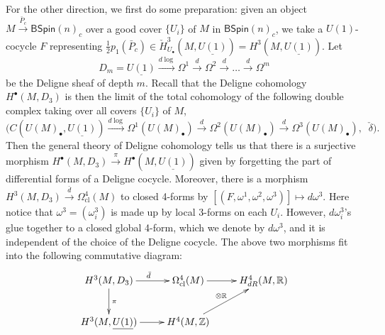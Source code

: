 \documentclass[letterpaper,10pt, oneside]{article} %
\newcommand {\emptycomment}[1]{}
\newcommand{\BSpin}{\mathsf{BSpin}}%
\newcommand{\cl}{\mathrm{cl}}
\newcommand{\R}{\mathbb R}\newcommand{\Z}{\mathbb Z}
\newcommand{\half}{\frac{1}{2}}
\newcommand{\bg}{\bar{g}}
\begin{document}
\emptycomment{
Since the 2-morphism between $g_{ij}\circ
g_{jk} \Leftarrow g_{ik}$ is given by an $U(1)$-function   $f_{ijk}$,
the projected $G$-valued function $\bg_{ij}$ satisfies strict cocycle
condition $\bg_{ij}\circ \bg_{jk} =\bg_{ik}$. This gives us a
principal bundle which is exactly the principal bundle $\bar{P}$ that
we start with.  Further equation \eqref{eq:a-omega3-theta} implies that $\theta_i$
provides a connection for $\bar{P}$. Moreover, the curvature 2-form $R_i :=
d\theta_i +*[\theta_i, \theta_i]$ is a global 2-form in $\Omega^2(M,
Ad_\g)$. Moreover,
\[d cs_3(\theta_i) = (R_i, R_i)^\g =:\alpha \]
is a global 4-form in $\Omega^4(M)$.
According to the discussion in Section
\ref{sec:deligne-coh}, the 4-form $\alpha$ represents $\frac{1}{2}
p_1(\bar{P}_c)$ and  \eqref{eq:a-omega3-theta} \eqref{eq:f-omega1}
\eqref{eq:f-F-omega1} implies that $\frac{1}{2}
p_1(\bar{P}_c)=0$.}

For the other direction, we first do some preparation: given an object $M \xrightarrow{\bar{P}_c} \BSpin(n)_c$ over a good cover $\{ U_i\}$ of $M$ in $\BSpin(n)_c$, we
take a $U(1)$-cocycle $F$ representing $\half p_1(\bar{P}_c) \in \check{H}^3_{U_\bullet}(M,
\underline{U(1)})=H^3(M,
\underline{U(1)})$. Let
\begin{equation}\label{eq:Dp}
D_m=\underline{U(1)}\xrightarrow{d\log}\Omega^1\xrightarrow{d}\Omega^2\xrightarrow{d}\dots \xrightarrow{d}\Omega^m
\end{equation}
be the Deligne sheaf of depth $m$. Recall that the Deligne cohomology $H^\bullet(M,
D_3)$ is then the limit of the total cohomology of the following double complex
taking over all covers $\{U_i\}$ of $M$,
\[
\Big( C(U(M)_\bullet, \underline{U(1)}) \xrightarrow{d\log}
\Omega^1(U(M)_\bullet) \xrightarrow{d} \Omega^2(U(M)_\bullet )
\xrightarrow{d} \Omega^3(U(M)_\bullet), \; \;\check{\delta} \Big).
\] Then the general theory of Deligne cohomology tells us that there
is a surjective morphism
$
H^\bullet(M, D_3) \xrightarrow{\pi} H^\bullet(M, \underline{U(1)})$
given by forgetting the part of differential forms of a
Deligne cocycle. Moreover, there is a morphism $H^3(M, D_3)\xrightarrow{\bar{d}}
\Omega^4_{\cl}(M)$ to closed 4-forms by $[(F, \omega^1, \omega^2, \omega^3)] \mapsto
d\omega^3$. Here notice that $\omega^3=(\omega^3_i)$ is made up by
local 3-forms on each $U_i$. However, $d\omega^3_i$'s glue together to a closed
global 4-form, which we denote by $d\omega^3$, and it is independent of the choice of the Deligne
cocycle.    The above two morphisms fit into the following commutative diagram:
\begin{equation}\label{eq:deligne}
\xymatrix{H^3(M, D_3) \ar[d]^\pi \ar[r]^{\bar{d}} &\Omega_{\cl}^4(M) \ar[r] & H^4_{dR}(M, \R) \\
H^3(M, \underline{U(1)}) \ar[r] & H^4(M, \Z) \ar[ur]^{\otimes \R} }
\end{equation}
\end{document}
